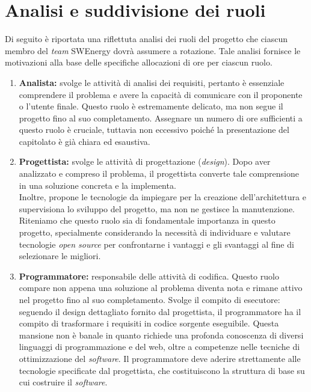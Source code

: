 \section{Analisi e suddivisione dei ruoli}

Di seguito è riportata una riflettuta analisi dei ruoli del progetto che ciascun
membro del \textit{team} SWEnergy dovrà assumere a rotazione.
Tale analisi fornisce le motivazioni alla base delle specifiche allocazioni di ore 
per ciascun ruolo.
\begin{enumerate}

\item \textbf{Analista:} svolge le attività di analisi dei requisiti, pertanto è essenziale comprendere 
il problema e avere la capacità di comunicare con il proponente o l'utente finale. 
Questo ruolo è estremamente delicato, ma non segue il progetto fino al suo completamento.
Assegnare un numero di ore sufficienti a questo ruolo è cruciale, 
tuttavia non eccessivo poiché la presentazione del capitolato è già chiara ed esaustiva.

\item \textbf{Progettista:} svolge le attività di progettazione (\textit{design}). 
Dopo aver analizzato e compreso il problema, il progettista converte tale comprensione in una 
soluzione concreta e la implementa. \\
Inoltre, propone le tecnologie da impiegare per la creazione dell'architettura e supervisiona 
lo sviluppo del progetto, ma non ne gestisce la manutenzione.
Riteniamo che questo ruolo sia di fondamentale importanza in questo progetto, specialmente 
considerando la necessità di individuare e valutare tecnologie \textit{open source} per confrontarne 
i vantaggi e gli svantaggi al fine di selezionare le migliori.

\item \textbf{Programmatore:} responsabile delle attività di codifica. 
Questo ruolo compare non appena una soluzione al problema diventa nota e rimane attivo nel progetto 
fino al suo completamento. 
Svolge il compito di esecutore: seguendo il design dettagliato fornito dal progettista, il programmatore 
ha il compito di trasformare i requisiti in codice sorgente eseguibile. 
Questa mansione non è banale in quanto richiede una profonda conoscenza di diversi linguaggi di programmazione 
e del web, oltre a competenze nelle tecniche di ottimizzazione del \textit{software}. 
Il programmatore deve aderire strettamente alle tecnologie specificate dal progettista, 
che costituiscono la struttura di base su cui costruire il \textit{software}.



\end{enumerate}

